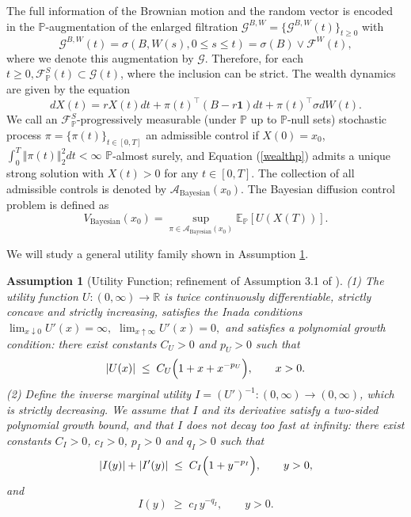 \documentclass[11pt]{article}
\newtheorem{assumption}{Assumption}
\theoremstyle{definition}
\begin{document}
The full information of the Brownian motion and the random vector is encoded in the $\mathbb{P}$-augmentation of the enlarged filtration $\mathcal{G}^{B,W} = \{\mathcal{G}^{B,W}(t)\}_{t \geq 0}$ with 
$$\mathcal{G}^{B,W}(t) = \sigma\left(B, W(s), 0 \leq s \leq t\right) = \sigma(B)\vee \mathcal{F}^W(t),$$
where we denote this augmentation by $\mathcal{G}$. 
Therefore, for each $t \geq 0, \mathcal{F}^S_{\mathbb{P}}(t) \subset \mathcal{G}(t)$, where the inclusion can be strict. The wealth dynamics are given by the equation \begin{equation}\label{wealthp}
		d X(t) =  rX(t)dt + \pi(t)^\top\left(B-r\mathbf{1}\right)dt + \pi(t)^\top \sigma dW(t).
\end{equation}
We call an $\mathcal{F}^S_{\mathbb{P}}$-progressively measurable (under $\mathbb{P}$ up to $\mathbb{P}$-null sets) stochastic process $\pi= \{\pi(t)\}_{t \in [0,T]}$ { an admissible control} if $X(0) = x_0$, $\int_0^T \left \Vert \pi(t) \right\Vert_2^2dt < \infty$ $\mathbb{P}$-almost surely, and Equation (\ref{wealthp}) admits a unique strong solution with $X(t) > 0$ for any $t \in [0,T]$. The collection of all admissible controls is denoted by $\mathcal{A}_{\text{Bayesian}}(x_0)$.
The Bayesian diffusion control problem is defined as
\begin{equation}\label{OriginalKaratzas}{
  V_{\text{Bayesian}}(x_0) = \sup_{\pi \in \mathcal{A}_{\text{Bayesian}}(x_0)}\mathbb{E}_{\mathbb{P}}\left[U(X(T))\right]. }
\end{equation}


We will study a general utility family shown in Assumption \ref{ass:utility}. 

\begin{assumption}[Utility Function; refinement of Assumption 3.1 of \cite{KZ98}]
\label{ass:utility}
(1) The utility function $U: (0,\infty)\to\mathbb{R}$ is twice continuously differentiable,
strictly concave and strictly increasing, satisfies the Inada conditions $\lim_{x\downarrow 0}U'(x)=\infty,$ $\lim_{x\uparrow\infty}U'(x)=0,$
and satisfies a polynomial growth condition:
there exist constants $C_U>0$ and $p_U>0$ such that
{\[
  |U(x)| \;\le\; C_U\Bigl(1+x+x^{-p_U}\Bigr),
  \qquad x>0.
\]}
(2) Define the inverse marginal utility
$I=(U')^{-1}:(0,\infty)\to(0,\infty)$, which is strictly decreasing. 
We assume that $I$ and its derivative satisfy a two-sided polynomial growth bound, and that 
$I$ does not decay too fast at infinity: there exist constants $C_I>0$, $c_I>0$, $p_I>0$ {and $q_I > 0$} such that
{\[
  |I(y)| + |I'(y)|
  \;\le\; C_I\Bigl(1+y^{-p_I}\Bigr),
  \qquad y>0,
\]}
and
\[
  I(y) \;\ge\; c_I\,y^{{-q_I}},
  \qquad y>0.
\]
\end{assumption}
\end{document}

